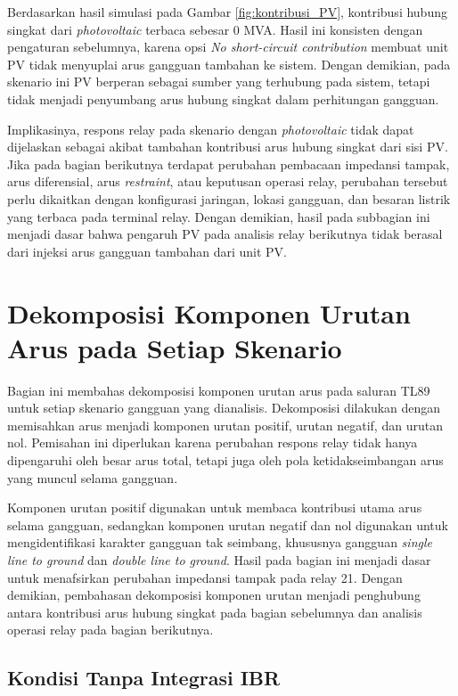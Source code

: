 Berdasarkan hasil simulasi pada Gambar \ref{fig:kontribusi_PV}, kontribusi hubung singkat dari \textit{photovoltaic} terbaca sebesar 0 MVA. Hasil ini konsisten dengan pengaturan sebelumnya, karena opsi \textit{No short-circuit contribution} membuat unit PV tidak menyuplai arus gangguan tambahan ke sistem. Dengan demikian, pada skenario ini PV berperan sebagai sumber yang terhubung pada sistem, tetapi tidak menjadi penyumbang arus hubung singkat dalam perhitungan gangguan.

Implikasinya, respons relay pada skenario dengan \textit{photovoltaic} tidak dapat dijelaskan sebagai akibat tambahan kontribusi arus hubung singkat dari sisi PV. Jika pada bagian berikutnya terdapat perubahan pembacaan impedansi tampak, arus diferensial, arus \textit{restraint}, atau keputusan operasi relay, perubahan tersebut perlu dikaitkan dengan konfigurasi jaringan, lokasi gangguan, dan besaran listrik yang terbaca pada terminal relay. Dengan demikian, hasil pada subbagian ini menjadi dasar bahwa pengaruh PV pada analisis relay berikutnya tidak berasal dari injeksi arus gangguan tambahan dari unit PV.

\section{Dekomposisi Komponen Urutan Arus pada Setiap Skenario}
\label{sec:dekomposisi_arus}

Bagian ini membahas dekomposisi komponen urutan arus pada saluran TL89 untuk setiap skenario gangguan yang dianalisis. Dekomposisi dilakukan dengan memisahkan arus menjadi komponen urutan positif, urutan negatif, dan urutan nol. Pemisahan ini diperlukan karena perubahan respons relay tidak hanya dipengaruhi oleh besar arus total, tetapi juga oleh pola ketidakseimbangan arus yang muncul selama gangguan.

Komponen urutan positif digunakan untuk membaca kontribusi utama arus selama gangguan, sedangkan komponen urutan negatif dan nol digunakan untuk mengidentifikasi karakter gangguan tak seimbang, khususnya gangguan \textit{single line to ground} dan \textit{double line to ground}. Hasil pada bagian ini menjadi dasar untuk menafsirkan perubahan impedansi tampak pada relay 21. Dengan demikian, pembahasan dekomposisi komponen urutan menjadi penghubung antara kontribusi arus hubung singkat pada bagian sebelumnya dan analisis operasi relay pada bagian berikutnya.

\subsection{Kondisi Tanpa Integrasi IBR}

